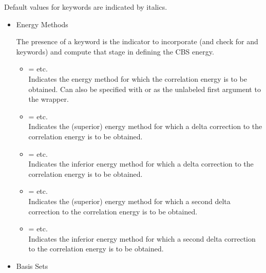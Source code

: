 
Default values for keywords are indicated by italics.

\begin{itemize}
\item Energy Methods

The presence of a  keyword is the indicator to incorporate (and check for 
 and  keywords) and compute that stage in defining the CBS energy.
\begin{itemize}
\item[]  =  \textbar\;  \textbar\; etc. \\
Indicates the energy method for which the correlation energy is to be obtained. Can also be specified with 
or as the unlabeled first argument to the wrapper.
\item[]  =  \textbar\;  \textbar\; etc. \\
Indicates the (superior) energy method for which a delta correction to the correlation energy is to be obtained.
\item[]  = \textit{} \textbar\;  \textbar\; etc. \\
Indicates the inferior energy method for which a delta correction to the correlation energy is to be obtained.
\item[]  =  \textbar\;  \textbar\; etc. \\
Indicates the (superior) energy method for which a second delta correction to the correlation energy is to be obtained.
\item[]  = \textit{} \textbar\;  \textbar\; etc. \\
Indicates the inferior energy method for which a second delta correction to the correlation energy is to be obtained.
\end{itemize}

\item Basis Sets


\end{itemize}
